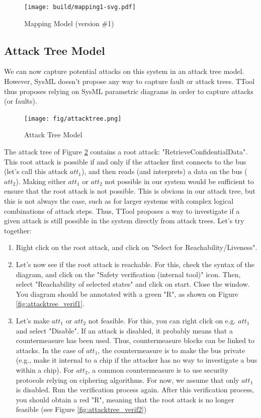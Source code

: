 \documentclass[12pt]{article}
\begin{document}
\begin{figure}[htbp]
\centering
\texttt{[image: build/mapping1-svg.pdf]}
\caption{Mapping Model (version \#1)} \label{fig:mapping1}
\end{figure}

\subsection{Attack Tree Model}
We can now capture potential attacks on this system in an attack tree model. However, SysML doesn't propose any way to capture fault or attack trees. TTool thus proposes relying on SysML parametric diagrams in order to capture attacks (or faults).

\begin{figure}[htbp]
\centering
\texttt{[image: fig/attacktree.png]}
\caption{Attack Tree Model} \label{fig:attacktree}
\end{figure}

The attack tree of Figure \ref{fig:attacktree} contains a root attack: "RetrieveConfidentialData". This root attack is possible if and only if the attacker first connects to the bus (let's call this attack $att_1$), and then reads (and interprets) a data on the bus ($att_2$). Making either $att_1$ or $att_2$ not possible in our system would be sufficient to ensure that the root attack is not possible. This is obvious in our attack tree, but this is not always the case, such as for larger systems with complex logical combinations of attack steps. Thus, TTool proposes a way to investigate if a given attack is still possible in the system directly from attack trees. Let's try together:
\begin{enumerate}
\item Right click on the root attack, and click on  "Select for Reachability/Liveness".
\item Let's now see if the root attack is reachable. For this, check the syntax of the diagram, and click on the "Safety verification (internal tool)" icon. Then, select "Reachability of selected states" and click on start. Close the window. You diagram should be annotated with a green "R", as shown on Figure \ref{fig:attacktree_verif1}.
\item Let's make $att_1$ or $att_2$ not feasible. For this, you can right click on e.g. $att_1$ and select "Disable". If an attack is disabled, it probably means that a countermeasure has been used. Thus, countermeasure blocks can be linked to attacks. In the case of $ att_1$, the countermeasure is to make the bus private (e.g., make it internal to a chip if the attacker has no way to investigate a bus within a chip). For $att_2$, a common countermeasure is to use security protocols relying on ciphering algorithms. For now, we assume that only $att_1$ is disabled. Run the verification process again. After this verification process, you should obtain a red "R", meaning that the root attack is no longer feasible (see Figure \ref{fig:attacktree_verif2})
 \end{enumerate}
\end{document}
